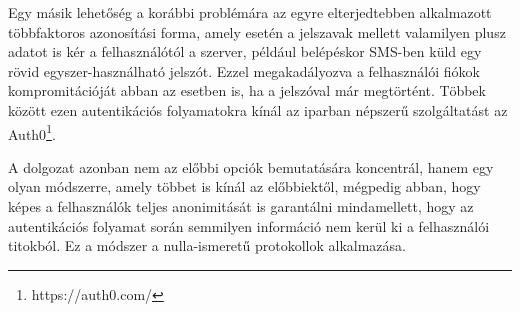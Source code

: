 Egy másik lehetőség a korábbi problémára az egyre elterjedtebben alkalmazott többfaktoros azonosítási forma, amely esetén a jelszavak mellett valamilyen plusz adatot is kér a felhasználótól a szerver, például belépéskor SMS-ben küld egy rövid egyszer-használható jelszót. Ezzel megakadályozva a felhasználói fiókok kompromitációját abban az esetben is, ha a jelszóval már megtörtént. Többek között ezen autentikációs folyamatokra kínál az iparban népszerű szolgáltatást az Auth0\footnote{https://auth0.com/}.

A dolgozat azonban nem az előbbi opciók bemutatására koncentrál, hanem egy olyan módszerre, amely többet is kínál az előbbiektől, mégpedig abban, hogy képes a felhasználók teljes anonimitását is garantálni mindamellett, hogy az autentikációs folyamat során semmilyen információ nem kerül ki a felhasználói titokból. Ez a módszer a nulla-ismeretű protokollok alkalmazása.